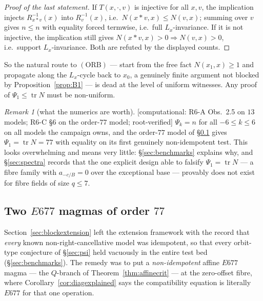 \documentclass[11pt]{article}
\theoremstyle{plain}
\theoremstyle{definition}
\theoremstyle{remark}
\newtheorem*{remark*}{Remark}
\numberwithin{equation}{section}
\newcommand{\op}{\mathbin{*}}
\newcommand{\tr}{\operatorname{tr}}
\newcommand{\statusbox}[1]{{\small\sloppy\textsf{[#1]}}}
\newcommand{\COMP}[1]{\statusbox{computational: #1}}
\begin{document}
\begin{proof}[Proof of the last statement]
If $T(x,\cdot,v)$ is injective for all $x,v$, the implication injects
$R_{x\op v}^{-1}(x)$ into $R_v^{-1}(x)$, i.e.\ $N(x\op v,x)\le N(v,x)$; summing
over $v$ gives $n\le n$ with equality forced termwise, i.e.\ full
$L_x$-invariance. If it is not injective, the implication still gives
$N(x\op v,x)>0\Rightarrow N(v,x)>0$, i.e.\ support $L_x$-invariance. Both are
refuted by the displayed counts.
\end{proof}

So the natural route to $(\mathrm{ORB})$ --- start from the free fact
$N(x_1,x)\ge1$ and propagate along the $L_x$-cycle back to $x_0$, a genuinely
finite argument not blocked by Proposition~\ref{prop:B1} --- is dead at the level
of uniform witnesses. Any proof of $\Psi_1\le\tr N$ must be non-uniform.

\begin{remark*}[what the numerics are worth]
\COMP{R6-A Obs.~2.5 on $13$ models; R6-C \S6 on the order-$77$ model; root-verified}
$\Psi_k = n$ for all $-6\le k\le6$ on all models the campaign owns, and the
order-$77$ model of \S\ref{sec:m77} gives $\Psi_1 = \tr N = 77$ with equality on
its first genuinely non-idempotent test. This looks overwhelming and means very
little: \S\ref{sec:benchmarks} explains why, and \S\ref{sec:spectra} records that
the one explicit design able to falsify $\Psi_1 = \tr N$ --- a fibre family with
$a_{-c/B} = 0$ over the exceptional base --- provably does not exist for fibre
fields of size $q\le7$.
\end{remark*}
\subsection{Two $E677$ magmas of order $77$}\label{sec:m77}

Section~\ref{sec:blockextension} left the extension framework with the record that
\emph{every} known non-right-cancellative model was idempotent, so that every
orbit-type conjecture of \S\ref{sec:psi} held vacuously in the entire test bed
(\S\ref{sec:benchmarks}). The remedy was to put a \emph{non-idempotent} affine
$E677$ magma --- the $Q$-branch of Theorem~\ref{thm:affinecrit} --- at the
zero-offset fibre, where Corollary~\ref{cor:diagexplained} says the compatibility
equation is literally $E677$ for that one operation.
\end{document}
